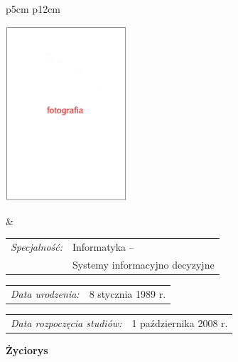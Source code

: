 \begin{titlepage}
    \newpage\thispagestyle{empty}
    \begin{tabular}{p{5cm} p{12cm}}
    \begin{minipage}{5cm}
    \center
    \includegraphics[height=6.5cm,width=4.5cm]{img/foto.jpg}
    \end{minipage}
    &
    \begin{minipage}{12cm}
    \begin{flushleft}
    \par\noindent\vspace{1\baselineskip}
    \begin{tabular}[h]{l l}
    {\normalsize\it Specjalność:} & Informatyka -- \\
    & Systemy informacyjno decyzyjne
    \end{tabular}
    \par\noindent\vspace{1\baselineskip}
    \begin{tabular}[h]{l l}
    {\normalsize\it Data urodzenia:} & {\normalsize 8 stycznia 1989 r.}
    \end{tabular}
    \par\noindent\vspace{1\baselineskip}
    \begin{tabular}[h]{l l}
    {\normalsize\it Data rozpoczęcia studiów:} & {\normalsize 1 października 2008 r.}
    \end{tabular}
    \par\noindent\vspace{1\baselineskip}
    \end{flushleft}
    \end{minipage}
    \end{tabular}
    \vspace*{1\baselineskip}
    \begin{center}
	{\large\bfseries Życiorys}\par\bigskip
    \end{center}


\end{titlepage}
